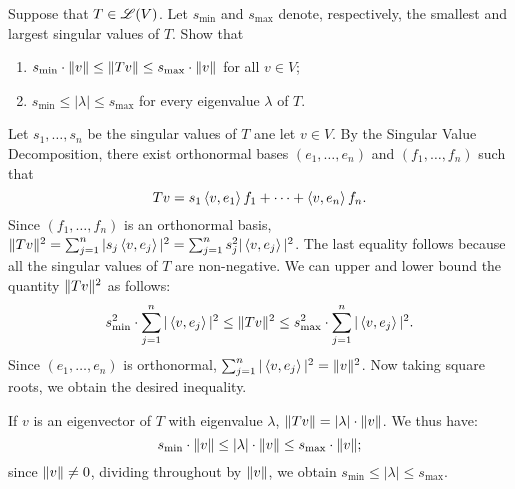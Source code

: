 \begin{exercise}
Suppose that $T \in \mathscr{L}(V)$. Let $s_{\min}$ and $s_{\max}$ denote, respectively,
the smallest and largest singular values of $T$. Show that
\begin{enumerate}
    \item $s_{\min} \cdot \lVert v\rVert \leq \lVert T v\rVert \leq s_{\max} \cdot \lVert v\rVert$
        for all $v \in V$;
    \item $s_{\min} \leq |\lambda| \leq s_{\max}$ for every eigenvalue $\lambda$ of
        $T$.
\end{enumerate}
\end{exercise}
\begin{solution}
Let $s_1, \ldots, s_n$ be the singular values of $T$ ane let $v \in V$. By the
Singular Value Decomposition, there exist orthonormal bases $(e_1, \ldots, e_n)$
and $(f_1, \ldots, f_n)$ such that
\[
    T v = s_1 \left \langle v, e_1 \right \rangle f_1 + \cdots + \left \langle v, e_n \right \rangle f_n.
\]
Since $(f_1, \ldots, f_n)$ is an orthonormal basis,
$\lVert T v\rVert^2 = \sum_{j = 1}^{n} | s_j \left \langle v, e_j \right \rangle|^2 =
\sum_{j = 1}^{n} s_j^2 |\left \langle v, e_j \right \rangle|^2$. The last equality follows because
all the singular values of $T$ are non-negative. We can upper and lower
bound the quantity $\lVert T v\rVert^2$ as follows:
\[
    s_{\min}^2  \cdot \sum_{j = 1}^{n} |\left \langle v, e_j \right \rangle|^2 \leq \lVert T v\rVert^2
    \leq  s_{\max}^2  \cdot \sum_{j = 1}^{n} |\left \langle v, e_j \right \rangle|^2.
\]
Since $(e_1, \ldots, e_n)$ is orthonormal,
$\sum_{j = 1}^{n} |\left \langle v, e_j \right \rangle|^2 = \lVert v\rVert^2$. Now taking square roots, we
obtain the desired inequality.

If $v$ is an eigenvector of $T$ with eigenvalue $\lambda$,
$\lVert T v\rVert = |\lambda | \cdot \lVert v\rVert$. We thus have:
\[
    s_{\min} \cdot \lVert v\rVert \leq |\lambda | \cdot \lVert v\rVert
                            \leq s_{\max} \cdot \lVert v\rVert;
\]
since $\lVert v\rVert \neq 0$, dividing throughout by $\lVert v\rVert$, we obtain
$s_{\min} \leq |\lambda| \leq s_{\max}$.
\end{solution}

